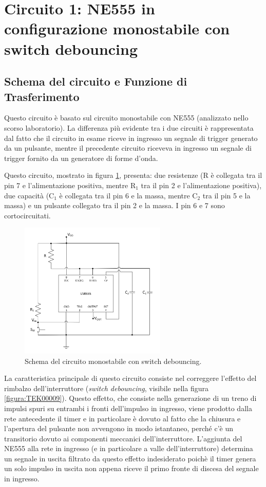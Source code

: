 \documentclass{report}
\begin{document}
\newpage
\section{Circuito 1: NE555 in configurazione monostabile con switch debouncing}
\subsection{Schema del circuito e Funzione di Trasferimento}
Questo circuito è basato sul circuito monostabile con NE555 (analizzato nello scorso laboratorio). La differenza più evidente tra i due circuiti è rappresentata dal fatto che il circuito in esame riceve in ingresso un segnale di trigger generato da un pulsante, mentre il precedente circuito riceveva in ingresso un segnale di trigger fornito da un generatore di forme d'onda.

Questo circuito, mostrato in figura \ref{figura:schema1}, presenta: due resistenze (R è collegata tra il pin 7 e l'alimentazione positiva, mentre $\mathrm{R_1}$ tra il pin 2 e l'alimentazione positiva), due capacità ($\mathrm{C_1}$ è collegata tra il pin 6 e la massa, mentre $\mathrm{C_2}$ tra il pin 5 e la massa) e un pulsante collegato tra il pin 2 e la massa. I pin 6 e 7 sono cortocircuitati.

\begin{figure}[h!]
	\centering
	\includegraphics[height=6.5cm]{immagini/schema1}
	\caption{Schema del circuito monostabile con switch debouncing.}
	\label{figura:schema1}
\end{figure}

\noindent La caratteristica principale di questo circuito consiste nel correggere l'effetto del rimbalzo dell'interruttore (\textit{switch debouncing}, visibile nella figura \ref{figura:TEK00009}). Questo effetto, che consiste nella generazione di un treno di impulsi spuri su entrambi i fronti dell'impulso in ingresso, viene prodotto dalla rete antecedente il timer e in particolare è dovuto al fatto che la chiusura e l'apertura del pulsante non avvengono in modo istantaneo, perché c'è un transitorio dovuto ai componenti meccanici dell'interruttore. L'aggiunta del NE555 alla rete in ingresso (e in particolare a valle dell'interruttore) determina un segnale in uscita filtrato da questo effetto indesiderato poichè il timer genera un solo impulso in uscita non appena riceve il primo fronte di discesa del segnale in ingresso. %
\end{document}
